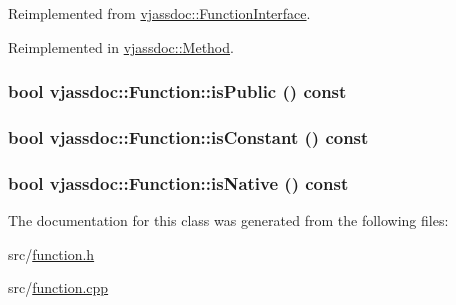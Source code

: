 Reimplemented from \hyperlink{classvjassdoc_1_1FunctionInterface_20b33401bc90587128da6bae1c6986d8}{vjassdoc::FunctionInterface}.

Reimplemented in \hyperlink{classvjassdoc_1_1Method_0a9c4b3b9cb2043eb1454ae72bbfe04f}{vjassdoc::Method}.\hypertarget{classvjassdoc_1_1Function_a8a4c34f800506e7803f875a831014b9}{
\subsubsection{\setlength{\rightskip}{0pt plus 5cm}bool vjassdoc::Function::isPublic () const}}
\label{classvjassdoc_1_1Function_a8a4c34f800506e7803f875a831014b9}


\hypertarget{classvjassdoc_1_1Function_d94c62d16b874437ed1bb59958f79063}{
\subsubsection{\setlength{\rightskip}{0pt plus 5cm}bool vjassdoc::Function::isConstant () const}}
\label{classvjassdoc_1_1Function_d94c62d16b874437ed1bb59958f79063}


\hypertarget{classvjassdoc_1_1Function_a4100d5c17d58de39de87648566f5d8b}{
\subsubsection{\setlength{\rightskip}{0pt plus 5cm}bool vjassdoc::Function::isNative () const}}
\label{classvjassdoc_1_1Function_a4100d5c17d58de39de87648566f5d8b}




The documentation for this class was generated from the following files:\begin{CompactItemize}
\item 
src/\hyperlink{function_8h}{function.h}\item 
src/\hyperlink{function_8cpp}{function.cpp}\end{CompactItemize}
